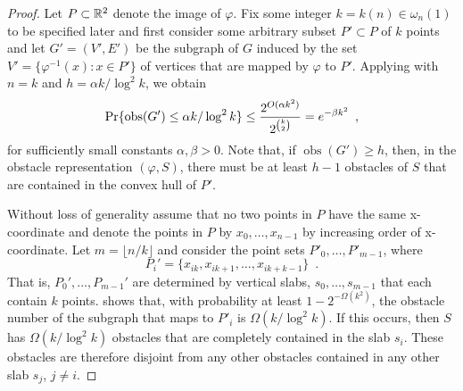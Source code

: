 \documentclass{patmorin}
\DeclareMathOperator{\obs}{obs}
\renewcommand{\note}[1]{}
\begin{document}
\begin{proof}
\note{We now specify that $k\in\omega(1)$ so that, later, $h\ge 1$.}
Let $P\subset\mathbb{R}^2$ denote the image of $\varphi$.  Fix some integer $k=k(n)\in\omega_n(1)$ to be
specified later and first consider some arbitrary subset $P'\subset P$
of $k$ points and let $G'=(V',E')$ be the subgraph of $G$ induced by
the set $V'=\{\varphi^{-1}(x):x\in P'\}$ of vertices that are mapped by
$\varphi$ to $P'$.  Applying  with $n=k$ and $h=\alpha
k/\log^2 k$, we obtain
\begin{equation}
     \Pr\{\obs(G') \le \alpha k/\log^2 k\} 
       \le \frac{2^{O(\alpha k^2)}}{2^{\binom{k}{2}}}
       = e^{-\beta k^2} \enspace , \eqlabel{g1}
\end{equation}
\note{Yes, $2^{\binom{k}{2}}$ is the number of possible Erd\H{o}s-R\'enyi random graphs (with a fixed vertex set). E-R graph is equivalent to random adjacency matrix.}%
for sufficiently small constants $\alpha,\beta > 0$.
Note that, if $\obs(G')\ge h$, then, in the obstacle representation
$(\varphi,S)$, there must be at least $h-1$ obstacles of $S$ that are
contained in the convex hull of $P'$.\note{This last statement is still
true for $h<1$ (because of the ``at least'').}

Without loss of generality assume that no two points in $P$ have the
same x-coordinate and denote the points in $P$ by $x_0,\ldots,x_{n-1}$
by increasing order of x-coordinate.  Let $m=\lfloor n/k\rfloor$ and
consider the point sets $P'_0,\ldots,P'_{m-1}$, where
\[ 
  P_i'=\{x_{ik},x_{ik+1},\ldots,x_{ik+k-1}\} \enspace .
\]  
That is, $P_0',\ldots,P_{m-1}'$ are determined by vertical slabs,
$s_0,\ldots,s_{m-1}$ that each contain $k$ points.   shows
that, with probability at least $1-2^{-\Omega(k^2)}$, the obstacle number
of the subgraph that maps to $P'_i$ is $\Omega(k/\log^2 k)$.  If this
occurs, then $S$ has $\Omega(k/\log^2 k)$ obstacles that are completely
contained in the slab $s_i$.  These obstacles are therefore disjoint
from any other obstacles contained in any other slab $s_j$, $j\neq i$.


\end{proof}
\end{document}
